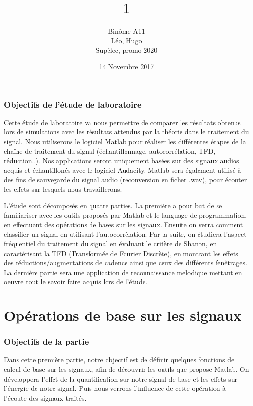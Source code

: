 \documentclass[french]{article}
\title{\bsc{SIG} 1}
\author{Binôme A11 \\ \bsc{Simon} Léo, \bsc{Levy--Falk} Hugo \\ Supélec, promo 2020}
\date{14 Novembre 2017}
\begin{document}
\maketitle
\tableofcontents
\clearpage
\listoffigures
\newpage
{}

\section*{Objectifs de l'étude de laboratoire}
Cette étude de laboratoire va nous permettre de comparer les résultats obtenus lors de simulations avec les résultats attendus par la théorie dans le traitement du signal. Nous utiliserons le logiciel Matlab pour réaliser les différentes étapes de la chaîne de traitement du signal (échantillonnage, autocorrélation, TFD, réduction..). Nos applications seront uniquement basées sur des signaux audios acquis et échantillonés avec le logiciel Audacity. Matlab sera également utilisé à des fins de sauvegarde du signal audio (reconversion en ficher .wav), pour écouter les effets sur lesquels nous travaillerons.

L'étude sont décomposés en quatre parties. La première a pour but de se familiariser avec les outils proposés par Matlab et le language de programmation, en effectuant des opérations de bases sur les signaux. Ensuite on verra comment classifier un signal en utilisant l'autocorrélation. Par la suite, on étudiera l'aspect fréquentiel du traitement du signal en évaluant le critère de Shanon, en caractérisant la TFD (Transformée de Fourier Discrète), en montrant les effets des réductions/augmentations de cadence ainsi que ceux des différents fenêtrages. La dernière partie sera une application de reconnaissance melodique mettant en oeuvre tout le savoir faire acquis lors de l'étude.

\newpage

\part{Opérations de base sur les signaux}

\section*{Objectifs de la partie}
Dans cette première partie, notre objectif est de définir quelques fonctions de calcul de base sur les signaux, afin de découvrir les outils que propose Matlab. On développera l'effet de la quantification sur notre signal de base et les effets sur l'énergie de notre signal. Puis nous verrons l'influence de cette opération à l'écoute des signaux traités.
\end{document}

